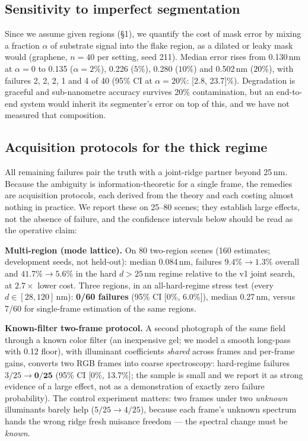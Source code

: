 \documentclass[10pt]{article}
\begin{document}
\subsection{Sensitivity to imperfect segmentation}\label{sec:masks}
Since we assume given regions (\S1), we quantify the cost of mask error by mixing a fraction $\alpha$ of substrate signal into the flake region, as a dilated or leaky mask would (graphene, $n{=}40$ per setting, seed 211). Median error rises from 0.130\,nm at $\alpha{=}0$ to 0.135 ($\alpha{=}2\%$), 0.226 ($5\%$), 0.280 ($10\%$) and 0.502\,nm ($20\%$), with failures 2, 2, 2, 1 and 4 of 40 (95\% CI at $\alpha{=}20\%$: [2.8, 23.7]\%). Degradation is graceful and sub-nanometre accuracy survives 20\% contamination, but an end-to-end system would inherit its segmenter's error on top of this, and we have not measured that composition.

\subsection{Acquisition protocols for the thick regime}\label{sec:protocols}
All remaining failures pair the truth with a joint-ridge partner beyond 25\,nm. Because the ambiguity is information-theoretic for a single frame, the remedies are acquisition protocols, each derived from the theory and each costing almost nothing in practice. We report these on 25--80 scenes; they establish large effects, not the absence of failure, and the confidence intervals below should be read as the operative claim:

\textbf{Multi-region (mode lattice).} On 80 two-region scenes (160 estimates; development seeds, not held-out): median 0.084\,nm, failures $9.4\%\!\to\!\mathbf{1.3\%}$ overall and $41.7\%\!\to\!\mathbf{5.6\%}$ in the hard $d{>}25$\,nm regime relative to the v1 joint search, at $2.7\times$ lower cost. Three regions, in an all-hard-regime stress test (every $d\in[28,120]$\,nm): \textbf{0/60 failures} (95\% CI [0\%, 6.0\%]), median 0.27\,nm, versus 7/60 for single-frame estimation of the same regions.

\textbf{Known-filter two-frame protocol.} A second photograph of the same field through a known color filter (an inexpensive gel; we model a smooth long-pass with 0.12 floor), with illuminant coefficients \emph{shared} across frames and per-frame gains, converts two RGB frames into coarse spectroscopy: hard-regime failures $3/25\to\mathbf{0/25}$ (95\% CI [0\%, 13.7\%]; the sample is small and we report it as strong evidence of a large effect, not as a demonstration of exactly zero failure probability). The control experiment matters: two frames under two \emph{unknown} illuminants barely help ($5/25\to4/25$), because each frame's unknown spectrum hands the wrong ridge fresh nuisance freedom --- the spectral change must be \emph{known}.
\end{document}
